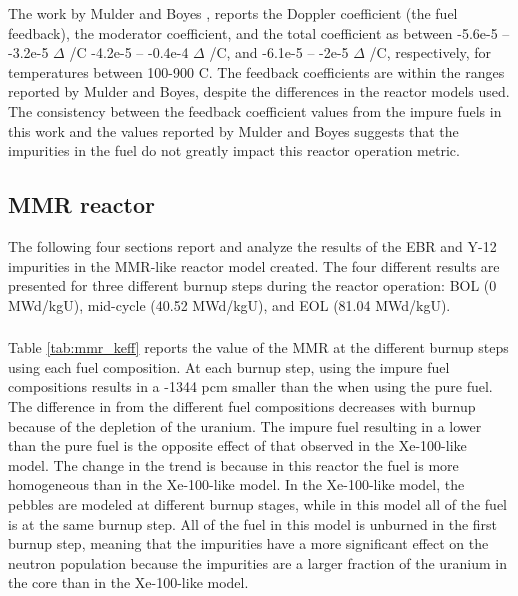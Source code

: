 The work by Mulder and Boyes \cite{mulder_neutronics_2020}, reports 
the Doppler coefficient (the fuel feedback), the moderator coefficient, 
and the total coefficient as between -5.6e-5 -- -3.2e-5 $\Delta$ 
\keff/\textdegree C
-4.2e-5 -- -0.4e-4 $\Delta$ \keff/\textdegree C, and -6.1e-5 -- -2e-5 
$\Delta$ \keff/\textdegree C, respectively, for temperatures between 100-900
\textdegree C. The feedback coefficients are within the ranges reported 
by Mulder and Boyes, despite the differences in the reactor models used.
The consistency between the feedback coefficient values from the impure 
fuels in this work and the values reported by Mulder and Boyes suggests that 
the impurities in the fuel do not greatly impact this reactor operation 
metric.  

\subsection{MMR reactor}
The following four sections report and analyze the results of the 
\gls{EBR} and Y-12 impurities in the \gls{MMR}-like reactor model 
created. The four different results are presented for three different 
burnup steps during the reactor operation: \gls{BOL} (0 MWd/kgU),
mid-cycle (40.52 MWd/kgU), and \gls{EOL} (81.04 MWd/kgU). 

\subsubsection{\keff}

Table \ref{tab:mmr_keff} reports the \keff value of the \gls{MMR} at the 
different burnup steps using each fuel composition. At each burnup step, 
using the impure fuel compositions results in a -1344 pcm 
smaller than the \keff when using the pure fuel. The difference in \keff 
from the different fuel compositions decreases with burnup because of 
the depletion of the uranium. The impure fuel resulting in a lower \keff 
than the pure fuel is the opposite 
effect of that observed in the Xe-100-like model. The change in the trend 
is because in this reactor the fuel is more homogeneous than in 
the Xe-100-like model. In the Xe-100-like model, the pebbles are modeled 
at different burnup stages, while in this model all of the fuel is at the 
same burnup step. All of the fuel in this model is unburned in the 
first burnup step, meaning that the impurities have a more significant 
effect on the neutron population because the impurities are a larger fraction 
of the uranium in the core than in the Xe-100-like model.

